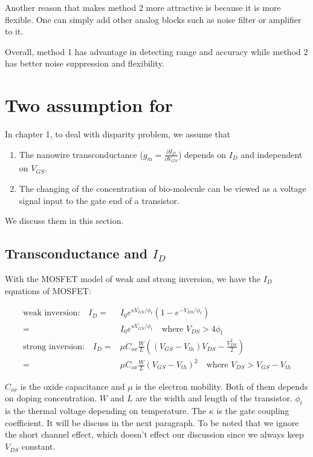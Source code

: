 Another reason that makes method 2 more attractive is because it is more flexible.
One can simply add other analog blocks such as noise filter or amplifier to it.

Overall, method 1 has advantage in detecting range and accuracy while method 2 has better noise suppression and flexibility.



\section{Two assumption for }
In chapter 1, to deal with disparity problem, we assume that
\begin{enumerate}
    \item The nanowire transconductance ($g_m = \frac{\partial I_D}{\partial V_{GS}}$) depends on $I_D$ and independent on $V_{GS}$.
    \item The changing of the concentration of bio-molecule can be viewed as a voltage signal input to the gate end of a transistor.
\end{enumerate}
We discuss them in this section.

\subsection{Transconductance and $I_D$}
With the MOSFET model of weak and strong inversion, we have the $I_D$ equations of MOSFET:
\setlength{\mathindent}{1.5cm}

\begin{align}
    \text{weak inversion:} \quad I_D   = & I_0e^{\kappa V_{GS}/\phi_t}(1 - e^{-V_{DS}/\phi_t})\\
                                       = & I_0e^{\kappa V_{GS}/\phi_t} \quad \text{where $V_{DS} > 4 \phi_t$ } \\
    \text{strong inversion:} \quad I_D = & \mu C_{ox} \frac{W}{L}((V_{GS} - V_{th})V_{DS} - \frac{V_{DS}^2}{2}) \\
                                       = & \mu C_{ox} \frac{W}{L}(V_{GS} - V_{th})^2 \quad \text{where $V_{DS} > V_{GS} - V_{th}$} \label{eq:ID_Strong}
\end{align}

$C_{ox}$ is the oxide capacitance and $\mu$ is the electron mobility.
Both of them depends on doping concentration.
$W$ and $L$ are the width and length of the transistor.
$\phi_t$ is the thermal voltage depending on temperature.
The $\kappa$ is the gate coupling coefficient.
It will be discuss in the next paragraph.
To be noted that we ignore the short channel effect, which doesn't effect our discussion since we always keep $V_{DS}$ constant.

